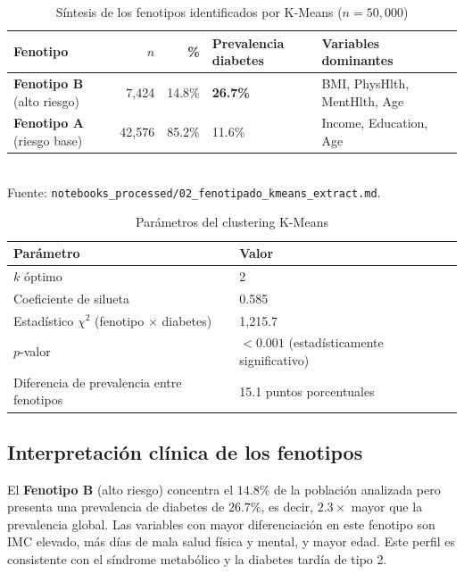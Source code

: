 \documentclass[12pt,a4paper]{article}
\begin{document}
\begin{table}[H]
  \centering
  \caption{Síntesis de los fenotipos identificados por K-Means ($n=50{,}000$)}
  \label{tab:fenotipos}
  \begin{tabular}{lrrlll}
    \toprule
    \textbf{Fenotipo} & \textbf{$n$} & \textbf{\%} & \textbf{Prevalencia diabetes} & \textbf{Variables dominantes}\\
    \midrule
    \textbf{Fenotipo B} (alto riesgo) & 7{,}424 & 14.8\% & \textbf{26.7\%} & BMI, PhysHlth, MentHlth, Age\\
    \textbf{Fenotipo A} (riesgo base) & 42{,}576 & 85.2\% & 11.6\% & Income, Education, Age\\
    \bottomrule
  \end{tabular}
  \smallskip\\
  \footnotesize Fuente: \texttt{notebooks\_processed/02\_fenotipado\_kmeans\_extract.md}.
\end{table}

\begin{table}[H]
  \centering
  \caption{Parámetros del clustering K-Means}
  \begin{tabular}{ll}
    \toprule
    \textbf{Parámetro} & \textbf{Valor}\\
    \midrule
    $k$ óptimo & 2\\
    Coeficiente de silueta & 0.585\\
    Estadístico $\chi^2$ (fenotipo $\times$ diabetes) & 1{,}215.7\\
    $p$-valor & $< 0.001$ (estadísticamente significativo)\\
    Diferencia de prevalencia entre fenotipos & 15.1 puntos porcentuales\\
    \bottomrule
  \end{tabular}
\end{table}

\subsection{Interpretación clínica de los fenotipos}

El \textbf{Fenotipo B} (alto riesgo) concentra el $14.8\%$ de la población analizada pero presenta una prevalencia de diabetes de $26.7\%$, es decir, $2.3\times$ mayor que la prevalencia global. Las variables con mayor diferenciación en este fenotipo son IMC elevado, más días de mala salud física y mental, y mayor edad. Este perfil es consistente con el síndrome metabólico y la diabetes tardía de tipo 2.
\end{document}

